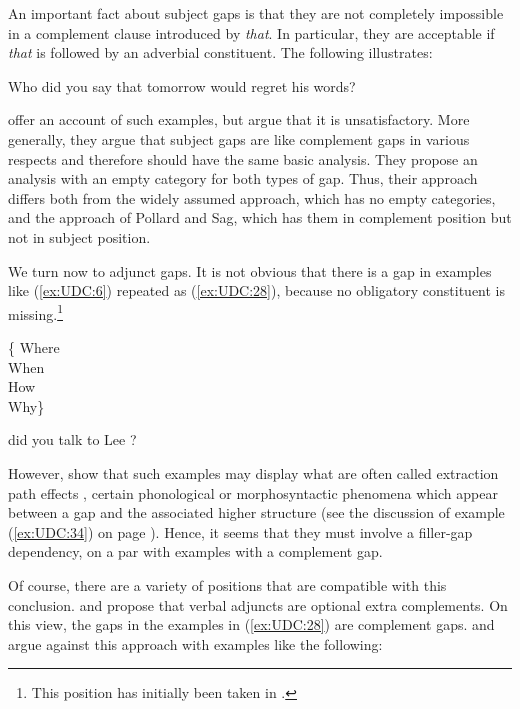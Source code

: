 \documentclass[output=paper
	        ,collection
	        ,collectionchapter
 	        ,biblatex
                ,babelshorthands
                ,newtxmath
                ,draftmode
                ,colorlinks, citecolor=brown
]{langscibook}
\begin{document}
{An important fact about subject gaps is that they are not completely
impossible in a complement clause introduced by \emph{that}. In
particular, they are acceptable if \emph{that} is followed by an
adverbial constituent. The following illustrates:

\begin{exe}
\ex \label{ex:UDC:27}
Who did you say that tomorrow \trace{} would regret his words?
\end{exe}

\noindent
\citet{Ginzburg:Sag:01} offer an account of such examples, but
\citet{Levine:Hukari:06} argue that it is unsatisfactory. More generally, they
argue that subject gaps are like complement gaps in various respects
and therefore should have the same basic analysis. They propose an
analysis with an empty category for both types of gap. Thus, their
approach differs both from the widely assumed approach, which has no
empty categories, and the approach of Pollard and Sag, which has them
in complement position but not in subject position.

We turn now to adjunct gaps. It is not obvious that there is a gap in
examples like (\ref{ex:UDC:6}) repeated as (\ref{ex:UDC:28}), because
no obligatory constituent is missing.\footnote{This position has initially
  been taken in \citet[176--180]{Pollard:Sag:94}. } 

\begin{exe}
\ex \label{ex:UDC:28}
\begin{avm} 
  \{ \normalfont Where\\ \normalfont When\\ \normalfont How\\
  \normalfont Why\}
\end{avm}
did you talk to Lee \trace{}?
\end{exe}

\noindent
However, \cite{hukari.levine:adjunct} show that such examples may display
what are often called extraction path effects , certain phonological or
morphosyntactic phenomena which appear between a gap and the associated
higher structure (see the discussion of example (\ref{ex:UDC:34}) on
page \pageref{ex:UDC:34}). Hence, it seems that they must
involve a filler-gap dependency, on a par with examples with a
complement gap.

Of course, there are a variety of positions that are compatible with
this conclusion. \citet{Bouma:Malouf:Sag:01} and \citet[168,
fn.~2]{Ginzburg:Sag:01} propose that verbal adjuncts are optional
extra complements.  On this view, the gaps in the examples in
(\ref{ex:UDC:28}) are complement gaps.  \citet{Levine:03} and
\citet{Levine:Hukari:06} argue against this approach with examples
like the following:

}
\end{document}

